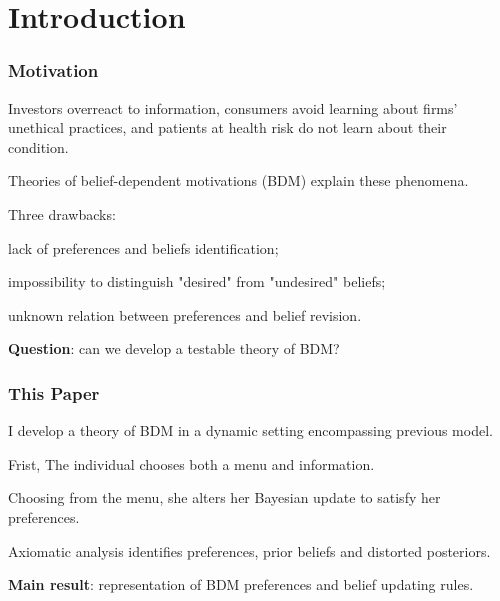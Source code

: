 \documentclass[usenames,dvipsnames,aspectratio=169,11pt, envcountsect]{beamer}
\begin{document}
\section{Introduction}

\begin{frame}
	\maketitle

\end{frame}

\begin{frame}\frametitle{Motivation}

	Investors overreact to information, consumers avoid learning about firms' unethical practices, and patients at health risk do not learn about their condition.

	\vfill

	Theories of belief-dependent motivations (BDM) explain these phenomena.

	\vfill \pause

	Three drawbacks:

	\vfill

	\begin{wideitemize}
		\item lack of preferences and beliefs identification;
		\item impossibility to distinguish "desired" from "undesired" beliefs;
		\item unknown relation between preferences and belief revision.
	\end{wideitemize}

	\vfill

	\textbf{Question}: can we develop a testable theory of BDM?

\end{frame}

\begin{frame}\frametitle{This Paper}

	I develop a theory of BDM in a dynamic setting encompassing previous model.

	\vfill

	Frist, The individual chooses both a menu and information.

	\vfill

	Choosing from the menu, she alters her Bayesian update to satisfy her preferences.

	\vfill

	Axiomatic analysis identifies preferences, prior beliefs and distorted posteriors.

	\vfill

	\textbf{Main result}: representation of BDM preferences and belief updating rules.

\end{frame}
\end{document}
